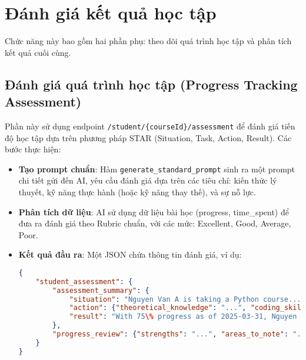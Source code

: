 \section{Đánh giá kết quả học tập}
Chức năng này bao gồm hai phần phụ: theo dõi quá trình học tập và phân tích kết quả cuối cùng.

\subsection{Đánh giá quá trình học tập (Progress Tracking Assessment)}
Phần này sử dụng endpoint \texttt{/student/\{courseId\}/assessment} để đánh giá tiến độ học tập dựa trên phương pháp STAR (Situation, Task, Action, Result). Các bước thực hiện:
\begin{itemize}
    \item \textbf{Tạo prompt chuẩn}: Hàm \texttt{generate\_standard\_prompt} sinh ra một prompt chi tiết gửi đến AI, yêu cầu đánh giá dựa trên các tiêu chí: kiến thức lý thuyết, kỹ năng thực hành (hoặc kỹ năng thay thế), và sự nỗ lực.
    \item \textbf{Phân tích dữ liệu}: AI sử dụng dữ liệu bài học (progress, time\_spent) để đưa ra đánh giá theo Rubric chuẩn, với các mức: Excellent, Good, Average, Poor.
    \item \textbf{Kết quả đầu ra}: Một JSON chứa thông tin đánh giá, ví dụ:
    \begin{lstlisting}[language=JSON]
{
    "student_assessment": {
        "assessment_summary": {
            "situation": "Nguyen Van A is taking a Python course...",
            "action": {"theoretical_knowledge": "...", "coding_skills": "...", "effort": "..."},
            "result": "With 75\% progress as of 2025-03-31, Nguyen Van A is on track..."
        },
        "progress_review": {"strengths": "...", "areas_to_note": "..."}
    }
}
    \end{lstlisting}
\end{itemize}

